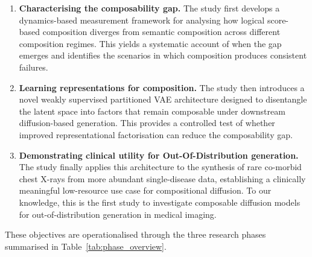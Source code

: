 \begin{enumerate}
    \item \textbf{Characterising the composability gap.}
    The study first develops a dynamics-based measurement framework for analysing how logical score-based composition diverges from semantic composition across different composition regimes. This yields a systematic account of when the gap emerges and identifies the scenarios in which composition produces consistent failures.

    \item \textbf{Learning representations for composition.}
    The study then introduces a novel weakly supervised partitioned VAE architecture designed to disentangle the latent space into factors that remain composable under downstream diffusion-based generation. This provides a controlled test of whether improved representational factorisation can reduce the composability gap.

    \item \textbf{Demonstrating clinical utility for Out-Of-Distribution generation.}
    The study finally applies this architecture to the synthesis of rare co-morbid chest X-rays from more abundant single-disease data, establishing a clinically meaningful low-resource use case for compositional diffusion. To our knowledge, this is the first study to investigate composable diffusion models for out-of-distribution generation in medical imaging.
\end{enumerate}

These objectives are operationalised through the three research phases summarised in Table~\ref{tab:phase_overview}.

